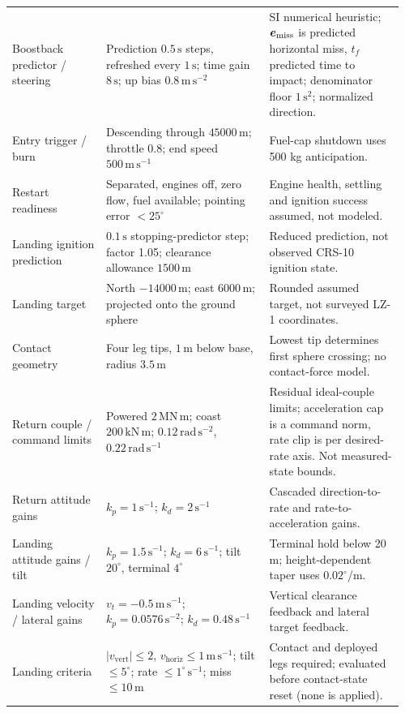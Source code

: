 \begin{longtable}{@{}>{\raggedright\arraybackslash}p{0.23\linewidth}>{\raggedright\arraybackslash}p{0.4\linewidth}>{\raggedright\arraybackslash}p{0.33\linewidth}@{}}
Boostback predictor / steering & Prediction $0.5\,\mathrm{s}$ steps, refreshed every $1\,\mathrm{s}$; time gain $8\,\mathrm{s}$; up bias $0.8\,\mathrm{m\,s^{-2}}$ & SI numerical heuristic; $\boldsymbol{e}_{\mathrm{miss}}$ is predicted horizontal miss, $t_f$ predicted time to impact; denominator floor $1\,\mathrm{s^2}$; normalized direction. \\
Entry trigger / burn & Descending through $45000\,\mathrm{m}$; throttle 0.8; end speed $500\,\mathrm{m\,s^{-1}}$ & Fuel-cap shutdown uses 500 kg anticipation. \\
Restart readiness & Separated, engines off, zero flow, fuel available; pointing error $<25^\circ$ & Engine health, settling and ignition success assumed, not modeled. \\
Landing ignition prediction & $0.1\,\mathrm{s}$ stopping-predictor step; factor 1.05; clearance allowance $1500\,\mathrm{m}$ & Reduced prediction, not observed CRS-10 ignition state. \\
Landing target & North $-14000\,\mathrm{m}$; east $6000\,\mathrm{m}$; projected onto the ground sphere & Rounded assumed target, not surveyed LZ-1 coordinates. \\
Contact geometry & Four leg tips, $1\,\mathrm{m}$ below base, radius $3.5\,\mathrm{m}$ & Lowest tip determines first sphere crossing; no contact-force model. \\
Return couple / command limits & Powered $2\,\mathrm{MN\,m}$; coast $200\,\mathrm{kN\,m}$; $0.12\,\mathrm{rad\,s^{-2}}$, $0.22\,\mathrm{rad\,s^{-1}}$ & Residual ideal-couple limits; acceleration cap is a command norm, rate clip is per desired-rate axis. Not measured-state bounds. \\
Return attitude gains & $k_p=1\,\mathrm{s^{-1}}$; $k_d=2\,\mathrm{s^{-1}}$ & Cascaded direction-to-rate and rate-to-acceleration gains. \\
Landing attitude gains / tilt & $k_p=1.5\,\mathrm{s^{-1}}$; $k_d=6\,\mathrm{s^{-1}}$; tilt $20^\circ$, terminal $4^\circ$ & Terminal hold below 20 m; height-dependent taper uses $0.02^\circ$/m. \\
Landing velocity / lateral gains & $v_t=-0.5\,\mathrm{m\,s^{-1}}$; $k_p=0.0576\,\mathrm{s^{-2}}$; $k_d=0.48\,\mathrm{s^{-1}}$ & Vertical clearance feedback and lateral target feedback. \\
Landing criteria & $|v_{\mathrm{vert}}|\le2$, $v_{\mathrm{horiz}}\le1\,\mathrm{m\,s^{-1}}$; tilt $\le5^\circ$; rate $\le1^\circ\,\mathrm{s^{-1}}$; miss $\le10\,\mathrm{m}$ & Contact and deployed legs required; evaluated before contact-state reset (none is applied). \\

\end{longtable}
